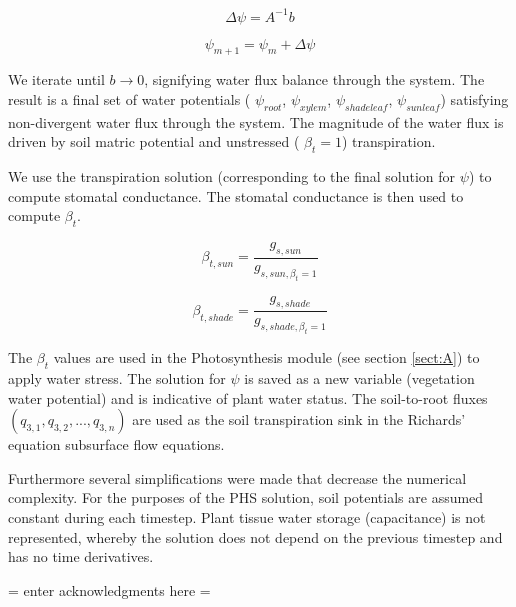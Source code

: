 \documentclass[draft,linenumbers]{agujournal}
\begin{document}
   \begin{linenomath*} \begin{equation} 
   \Delta\psi=A^{-1}b
   \end{equation} \end{linenomath*}

   \begin{linenomath*} \begin{equation} 
   \psi_{m+1}=\psi_m+\Delta\psi
   \end{equation} \end{linenomath*}

We iterate until $b\to 0$, signifying water flux balance through the system. The result is a final set of water potentials ( $\psi_{root}$, $\psi_{xylem}$, $\psi_{shadeleaf}$, $\psi_{sunleaf}$) satisfying non-divergent water flux through the system. 
The magnitude of the water flux is driven by soil matric potential and unstressed ( $\beta_t=1$) transpiration. 

We use the transpiration solution (corresponding to the final solution for $\psi$) to compute stomatal conductance. The stomatal conductance is then used to compute $\beta_t$. 

   \begin{linenomath*} \begin{equation} 
   \beta_{t,sun} = \dfrac{g_{s,sun}}{g_{s,sun,\beta_t=1}} 
   \end{equation} \end{linenomath*}

   \begin{linenomath*} \begin{equation} 
   \beta_{t,shade} = \dfrac{g_{s,shade}}{g_{s,shade,\beta_t=1}} 
   \end{equation} \end{linenomath*}

The $\beta_t$ values are used in the Photosynthesis module (see section \ref{sect:A}) to apply water stress. 
The solution for $\psi$ is saved as a new variable (vegetation water potential) and is indicative of plant water status.
The soil-to-root fluxes $\left( q_{3,1},q_{3,2},\text{...},q_{3,n}\right)$ are used as the soil transpiration sink in the Richards' equation subsurface flow equations.

    Furthermore several simplifications were made that decrease the numerical complexity.
    For the purposes of the PHS solution, soil potentials are assumed constant during each timestep.
    Plant tissue water storage (capacitance) is not represented, whereby the solution does not
    depend on the previous timestep and has no time derivatives.

\acknowledgments
 = enter acknowledgments here =


\nocite{*} 



\listofchanges
\end{document}
